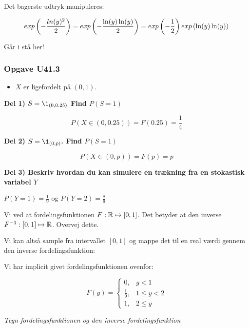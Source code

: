 Det bagerste udtryk manipuleres:

\begin{equation}
    exp \left( -\frac{ln(y)^2}{2}\right) =    exp \left( -\frac{ \ln(y) \ln(y) }{2}\right) = exp \left( -\frac{1}{2} \right) exp \left( \ln(y) \ln(y) \right) 
\end{equation}

Går i stå her!

\subsubsection{Opgave U41.3}

\begin{itemize}
    \item $X$ er ligefordelt på $(0,1)$.
\end{itemize}

\textbf{Del 1) $S = \1_{(0,0.25)}$ Find $P(S=1)$}

\begin{equation}
    P(X \in (0, 0.25)) = F(0.25) = \frac{1}{4}
\end{equation}

\textbf{Del 2) $S=  \1_{(0, p)}$. Find $P(S=1)$}

\begin{equation}
    P(X \in (0, p)) = F(p) = p
\end{equation}

\textbf{Del 3) Beskriv hvordan du kan simulere en trækning fra en stokastisk variabel $Y$}

$P(Y = 1) = \frac{1}{9}$ og $P(Y=2) = \frac{8}{9}$

Vi ved at fordelingsfunktionen $F: \mathbb{R} \mapsto [0,1]$. Det betyder at den inverse $F^{-1}: [0,1] \mapsto \mathbb{R}$. Overvej dette.

Vi kan altså sample fra intervallet $[0,1]$ og mappe det til en real værdi gennem den inverse fordelingsfunktion:

Vi har implicit givet fordelingsfunktionen ovenfor:

\begin{equation}
    F(y) = 
    \begin{cases}
        0, &y < 1 \\
        \frac{1}{9}, & 1 \leq y < 2 \\
        1, &2 \leq y
    \end{cases}
\end{equation}

\textit{Tegn fordelingsfunktionen og den inverse fordelingsfunktion}

